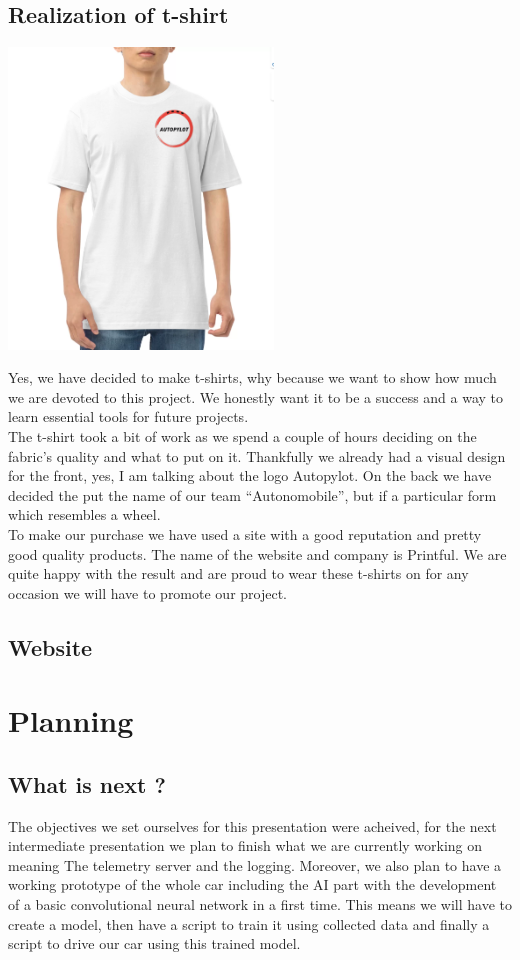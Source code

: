 \documentclass[12pt]{article}
\begin{document}
\subsection{Realization of t-shirt}
\centerline{\includegraphics[height=8cm]{../../t-shirts/white_t-shirt.png}}
Yes, we have decided to make t-shirts, why because we want to show how much we are devoted to this project. We honestly want it to be a success and a way to learn essential tools for future projects.\\ 

The t-shirt took a bit of work as we spend a couple of hours deciding on the fabric’s quality and what to put on it. Thankfully we already had a visual design for the front, yes, I am talking about the logo Autopylot.  On the back we have decided the put the name of our team “Autonomobile”, but if a particular form which resembles a wheel. \\ 

To make our purchase we have used a site with a good reputation and pretty good quality products. The name of the website and company is Printful.  We are quite happy with the result and are proud to wear these t-shirts on for any occasion we will have to promote our project. 

\subsection{Website}


\section {Planning}
\subsection {What is next ?}
The objectives we set ourselves for this presentation were acheived, for the next intermediate presentation we plan to finish what we are currently working on meaning The telemetry server and the logging. Moreover, we also plan to have a working prototype of the whole car including the AI part with the development of a basic convolutional neural network in a first time. This means we will have to create a model, then have a script to train it using collected data and finally a script to drive our car using this trained model.
\end{document}
